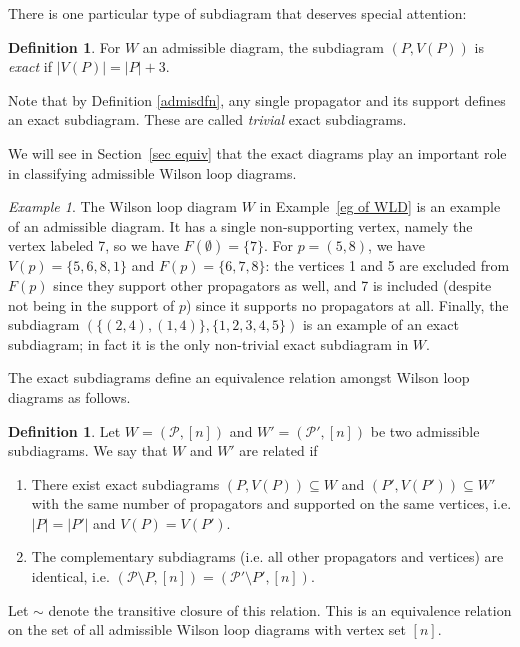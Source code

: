 \documentclass[11pt]{article}
\newcommand{\cP}{\mathcal{P}}
\theoremstyle{remark}
\newtheorem{eg}[thm]{Example}
\theoremstyle{definition}
\newtheorem{dfn}[thm]{Definition}
\begin{document}
There is one particular type of subdiagram that deserves special attention:

\begin{dfn}\label{def:exact diagram}
For $W$ an admissible diagram, the subdiagram $(P, V(P))$ is {\em exact} if $|V(P)| = |P| + 3$.
\end{dfn}

Note that by Definition \ref{admisdfn}, any single propagator and its support defines an exact subdiagram. These are called \emph{trivial} exact subdiagrams.

We will see in Section~\ref{sec equiv} that the exact diagrams play an important role in classifying admissible Wilson loop diagrams.

\vspace{3pt}
\begin{eg}
The Wilson loop diagram $W$ in Example~\ref{eg of WLD} is an example of an admissible diagram. It has a single non-supporting vertex, namely the vertex labeled 7, so we have $F(\emptyset) = \{7\}$. For $p = (5, 8)$, we have $V(p) = \{5,6,8,1\}$ and $F(p) = \{6, 7,8\}$: the vertices 1 and 5 are excluded from $F(p)$ since they support other propagators as well, and 7 is included (despite not being in the support of $p$) since it supports no propagators at all. Finally, the subdiagram $(\{(2, 4), (1, 4)\}, \{1, 2, 3, 4, 5\})$ is an example of an exact subdiagram; in fact it is the only non-trivial exact subdiagram in $W$.
\end{eg}

The exact subdiagrams define an equivalence relation amongst Wilson loop diagrams as follows.

\begin{dfn}\label{equivdfn} 
Let $W = (\cP,[n])$ and $W' = (\cP',[n])$ be two admissible subdiagrams. We say that $W$ and $W'$ are related if
\begin{enumerate}
\item There exist exact subdiagrams $(P, V(P)) \subseteq W$ and $(P', V(P')) \subseteq W'$ with the same number of propagators and supported on the same vertices, i.e. $|P| = |P'|$ and  $V(P) =  V(P')$.
\item The complementary subdiagrams (i.e. all other propagators and vertices) are identical, i.e. $(\cP \setminus P, [n]) = (\cP' \setminus P', [n])$.
\end{enumerate}
Let $\sim$ denote the transitive closure of this relation. This is an equivalence relation on the set of all admissible Wilson loop diagrams with vertex set $[n]$.
\end{dfn}
\end{document}
